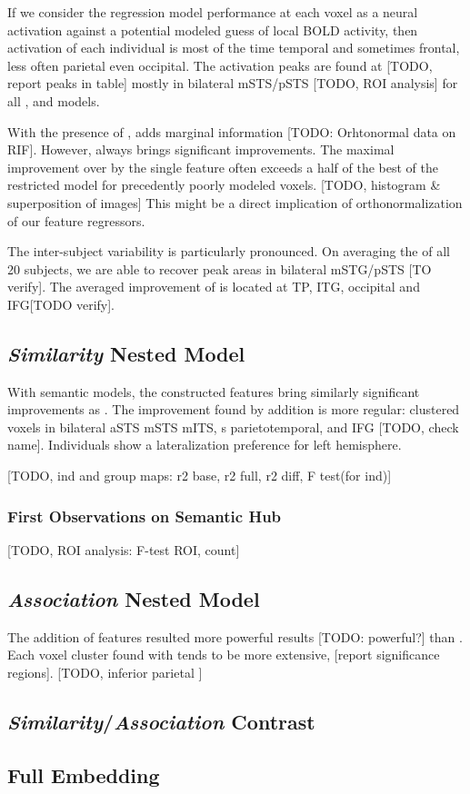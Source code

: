 If we consider the regression model performance at each voxel as a neural activation against a potential modeled guess of local BOLD activity,
then  activation of each individual is most of the time temporal and sometimes frontal, less often parietal even occipital. The activation peaks are found at [TODO, report peaks in table] mostly in bilateral mSTS/pSTS [TODO, ROI analysis] for all ,  and  models. 

With the presence of ,  adds marginal information [TODO: Orhtonormal data on RIF]. However,  always brings significant improvements. The maximal improvement over  by the single feature often exceeds a half of the best  of the restricted model for precedently poorly modeled voxels. [TODO, histogram \& superposition of images]
This might be a direct implication of orthonormalization of our feature regressors.

The inter-subject variability is particularly pronounced. On averaging the  of all 20 subjects, we are able to recover peak areas in bilateral mSTG/pSTS [TO verify]. The averaged improvement of  is located at TP, ITG, occipital and IFG[TODO verify]. 

\subsection{\emph{Similarity} Nested Model}

With \similarity semantic models, the constructed  features bring similarly significant improvements as . The improvement found by  addition is more regular: clustered voxels in bilateral aSTS mSTS mITS, s parietotemporal, and IFG [TODO, check name]. Individuals show a lateralization preference for left hemisphere. 

[TODO, ind and group maps: r2 base, r2 full, r2 diff, F test(for ind)]


\subsubsection{First Observations on Semantic Hub}

[TODO, ROI analysis: F-test ROI, count]

\subsection{\emph{Association} Nested Model}
The addition of  features resulted more powerful results [TODO: powerful?] than . Each voxel cluster found with  tends to be more extensive, [report significance regions]. [TODO, inferior parietal ]

\subsection{\emph{Similarity}/\emph{Association} Contrast}

\subsection{Full Embedding}
